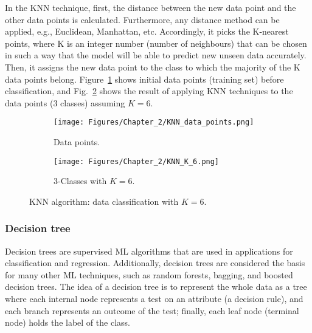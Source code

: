 In the KNN technique, first, the distance between the new data point and the other data points is calculated.
Furthermore, any distance method can be applied, e.g., Euclidean, Manhattan, etc.
Accordingly, it picks the K-nearest points, where K is an integer number (number of neighbours) that can be chosen in such a way that the model will be able to predict new unseen data accurately.
Then, it assigns the new data point to the class to which the majority of the K data points belong.
Figure~\ref{fig:datapoints} shows initial data points (training set) before classification, and Fig.~\ref{fig:KNN_K_5} shows the result of applying KNN techniques to the data points (3 classes) assuming \(K=6\).
\begin{figure}[!ht]
	\centering
	\begin{subfigure}{0.49\textwidth}		
		\centering
		\texttt{[image: Figures/Chapter\_2/KNN\_data\_points.png]}
		\caption{Data points.} 
		\label{fig:datapoints}
	\end{subfigure}
	\hfill
	\begin{subfigure}{0.49\textwidth}
		\centering
		\texttt{[image: Figures/Chapter\_2/KNN\_K\_6.png]}
		\caption{3-Classes with \(K=6\).} 
		\label{fig:KNN_K_5}
	\end{subfigure}	
	\caption{KNN algorithm: data classification with \(K=6\).}
	\label{fig:KNN}
\end{figure}
\subsubsection{Decision tree}
Decision trees are supervised ML algorithms that are used in applications for classifica\-tion and regression.
Additionally, decision trees are considered the basis for many other ML techniques, such as random forests, bagging, and boosted decision trees.
The idea of a decision tree is to represent the whole data as a tree where each internal node represents a test on an attribute (a decision rule), and each branch represents an outcome of the test; finally, each leaf node (terminal node) holds the label of the class.

